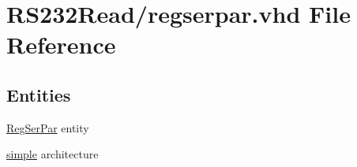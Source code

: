 \hypertarget{regserpar_8vhd}{}\section{R\+S232\+Read/regserpar.vhd File Reference}
\label{regserpar_8vhd}
\subsection*{Entities}
\begin{DoxyCompactItemize}
\item 
\hyperlink{class_reg_ser_par}{Reg\+Ser\+Par} entity
\item 
\hyperlink{class_reg_ser_par_1_1simple}{simple} architecture
\end{DoxyCompactItemize}
